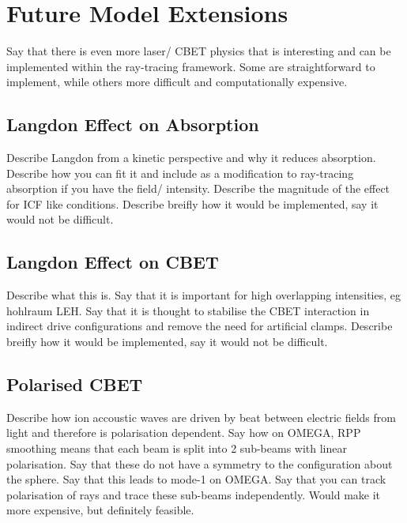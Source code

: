 \section{Future Model Extensions}

Say that there is even more laser/ CBET physics that is interesting and can be implemented within the ray-tracing framework.
Some are straightforward to implement, while others more difficult and computationally expensive.

\subsection{Langdon Effect on Absorption}

Describe Langdon from a kinetic perspective and why it reduces absorption.
Describe how you can fit it and include as a modification to ray-tracing absorption if you have the field/ intensity.
Describe the magnitude of the effect for ICF like conditions.
Describe breifly how it would be implemented, say it would not be difficult.

\subsection{Langdon Effect on CBET}

Describe what this is.
Say that it is important for high overlapping intensities, eg hohlraum LEH.
Say that it is thought to stabilise the CBET interaction in indirect drive configurations and remove the need for artificial clamps.
Describe breifly how it would be implemented, say it would not be difficult.

\subsection{Polarised CBET}

Describe how ion accoustic waves are driven by beat between electric fields from light and therefore is polarisation dependent.
Say how on OMEGA, RPP smoothing means that each beam is split into 2 sub-beams with linear polarisation.
Say that these do not have a symmetry to the configuration about the sphere.
Say that this leads to mode-1 on OMEGA.
Say that you can track polarisation of rays and trace these sub-beams independently.
Would make it more expensive, but definitely feasible.


